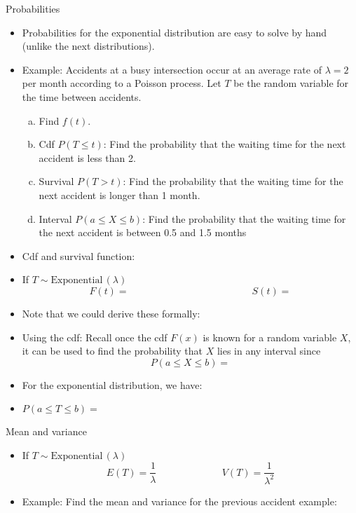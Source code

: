 \documentclass{article}
\newcommand{\follow}[1]{\sim \text{#1}\,}		%
\begin{document}
Probabilities\bigskip
\begin{itemize}
    \item Probabilities for the exponential distribution are easy to solve by hand (unlike the next distributions).
    \item Example: Accidents at a busy intersection occur at an average rate of $\lambda = 2$ per month according to a Poisson process. Let $T$ be the random variable for the time between accidents.
    \begin{enumerate}[a)]
        \item Find $f(t)$.\vspace{20pt}
        \item Cdf $P(T \le t)$: Find the probability that the waiting time for the next accident is less than 2.\vspace{70pt}
        \item Survival $P(T > t)$: Find the probability that the waiting time for the next accident is longer than 1 month.\vspace{70pt}
        \item Interval $P(a \le X \le b)$: Find the probability that the waiting time for the next accident is between 0.5 and 1.5 months\vspace{100pt}
    \end{enumerate}
    \item Cdf and survival function:
    \item[] If $T \follow{Exponential}(\lambda)$
    \[F(t) =  \hspace{150pt} S(t) = \]\vspace{20pt}
    \item[] Note that we could derive these formally:
    \item Using the cdf: Recall once the cdf $F(x)$ is known for a random variable $X$, it can be used to find the probability that $X$ lies in any interval since
    \[P(a \le X \le b) = \]
    \item[] For the exponential distribution, we have:\bigskip
    \item[] $P(a \le T \le b) = $
\end{itemize}\bigskip

Mean and variance\bigskip
\begin{itemize}
    \item If $T \follow{Exponential}(\lambda)$\smallskip
    \[E(T) = \frac{1}{\lambda} \hspace{80pt} V(T) = \frac{1}{\lambda^2}\]\bigskip
    \item Example: Find the mean and variance for the previous accident example:\bigskip
\end{itemize}\bigskip
\end{document}
